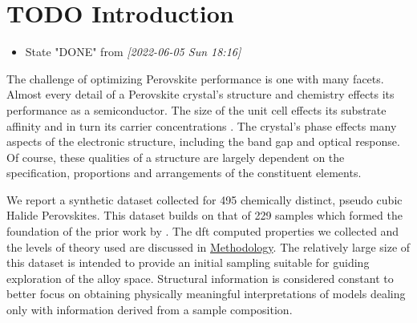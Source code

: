 \documentclass[twoside, twocolumn, 9pt, draft]{article}
\begin{document}
\renewcommand*\rmdefault{bch}\normalfont\upshape
\rmfamily
\section*{}
\vspace{-1cm}



\section*{{\bfseries\sffamily TODO} Introduction}
\label{sec:org8dc6f2f}
\begin{itemize}
\item State "DONE"       from              \textit{[2022-06-05 Sun 18:16]}
\end{itemize}
The challenge of optimizing Perovskite performance is one with many
facets. Almost every detail of a Perovskite crystal's structure and
chemistry effects its performance as a semiconductor. The size of the
unit cell effects its substrate affinity and in turn its carrier
concentrations \cite{jiang-2006-predic-lattic}. The crystal's phase
effects many aspects of the electronic structure, including the band
gap and optical response. Of course, these qualities of a structure
are largely dependent on the specification, proportions and
arrangements of the constituent elements.

We report a synthetic dataset collected for 495 chemically distinct,
pseudo cubic Halide Perovskites. This dataset builds on that of 229
samples which formed the foundation of the prior work by
\citet{mannodi-kanakkithodi-2021-data-driven-new}. The
\acrfull{dft} computed properties we collected and the levels
of theory used are discussed in \hyperref[sec:org4b02d79]{Methodology}. The relatively large
size of this dataset is intended to provide an initial sampling
suitable for guiding exploration of the alloy space. Structural
information is considered constant to better focus on obtaining
physically meaningful interpretations of models dealing only with
information derived from a sample composition.
\end{document}
